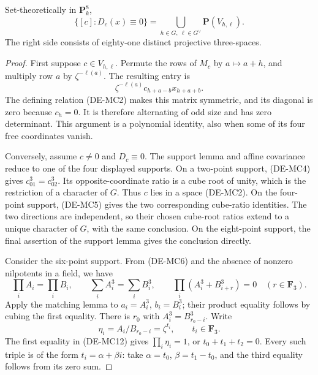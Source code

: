 \begin{theorem}
\label{thm:DE-Moore-singular-parameters}
Set-theoretically in \(\mathbf P^8_k\),
\[
 \{[c]:D_c(x)\equiv0\}
       =\bigcup_{h\in G,\ \ell\in G^\vee}\mathbf P(V_{h,\ell}).
                                                               \tag{DE-MC11}
\]
The right side consists of eighty-one distinct projective
three-spaces.
\end{theorem}
\begin{proof}
First suppose \(c\in V_{h,\ell}\).  Permute the rows of
\(M_c\) by \(a\mapsto a+h\), and multiply row \(a\) by
\(\zeta^{-\ell(a)}\).  The resulting entry is
\[
 \zeta^{-\ell(a)}c_{h+a-b}x_{h+a+b}.
\]
The defining relation (DE-MC2) makes this matrix symmetric,
and its diagonal is zero because \(c_h=0\).  It is therefore
alternating of odd size and has zero determinant.  This argument
is a polynomial identity, also when some of its four free
coordinates vanish.

Conversely, assume \(c\ne0\) and \(D_c\equiv0\).
The support lemma and affine covariance reduce to one of the
four displayed supports.  On a two-point support, (DE-MC4)
gives \(c_{01}^3=c_{02}^3\).  Its opposite-coordinate ratio
is a cube root of unity, which is the restriction of a character
of \(G\).  Thus \(c\) lies in a space (DE-MC2).
On the four-point support, (DE-MC5) gives the two corresponding
cube-ratio identities.  The two directions are independent,
so their chosen cube-root ratios extend to a unique character
of \(G\), with the same conclusion.  On the eight-point support,
the final assertion of the support lemma gives the conclusion
directly.

Consider the six-point support.  From (DE-MC6) and the absence
of nonzero nilpotents in a field, we have
\[
 \prod_iA_i=\prod_iB_i,\qquad
 \sum_iA_i^3=\sum_iB_i^3,\qquad
 \prod_i(A_i^3+B_{i+r}^3)=0\quad(r\in\mathbf F_3).
                                                               \tag{DE-MC12}
\]
Apply the matching lemma to \(a_i=A_i^3\), \(b_i=B_i^3\);
their product equality follows by cubing the first equality.
There is \(r_0\) with \(A_i^3=B_{r_0-i}^3\).
Write
\[
 \eta_i=A_i/B_{r_0-i}=\zeta^{t_i},\qquad t_i\in\mathbf F_3.
\]
The first equality in (DE-MC12) gives
\(\prod_i\eta_i=1\), or \(t_0+t_1+t_2=0\).
Every such triple is of the form
\(t_i=\alpha+\beta i\): take
\(\alpha=t_0\), \(\beta=t_1-t_0\), and the third equality
follows from its zero sum.


\end{proof}
